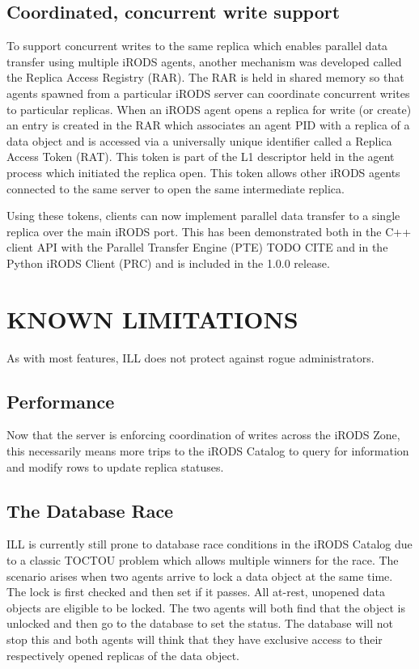 \documentclass{irodsugm}
\begin{document}
\subsection*{Coordinated, concurrent write support}
To support concurrent writes to the same replica which enables parallel data transfer using multiple iRODS agents, another mechanism was developed called the Replica Access Registry (RAR). The RAR is held in shared memory so that agents spawned from a particular iRODS server can coordinate concurrent writes to particular replicas. When an iRODS agent opens a replica for write (or create) an entry is created in the RAR which associates an agent PID with a replica of a data object and is accessed via a universally unique identifier called a Replica Access Token (RAT). This token is part of the L1 descriptor held in the agent process which initiated the replica open. This token allows other iRODS agents connected to the same server to open the same intermediate replica.

Using these tokens, clients can now implement parallel data transfer to a single replica over the main iRODS port. This has been demonstrated both in the C++ client API with the Parallel Transfer Engine (PTE) TODO CITE and in the Python iRODS Client (PRC)\cite{prc} and is included in the 1.0.0 release.

\section*{KNOWN LIMITATIONS}

As with most features, ILL does not protect against rogue administrators.

\subsection*{Performance}
Now that the server is enforcing coordination of writes across the iRODS Zone, this necessarily means more trips to the iRODS Catalog to query for information and modify rows to update replica statuses.

\subsection*{The Database Race}
ILL is currently still prone to database race conditions in the iRODS Catalog due to a classic TOCTOU\cite{toctou} problem which allows multiple winners for the race. The scenario arises when two agents arrive to lock a data object at the same time. The lock is first checked and then set if it passes. All at-rest, unopened data objects are eligible to be locked. The two agents will both find that the object is unlocked and then go to the database to set the status. The database will not stop this and both agents will think that they have exclusive access to their respectively opened replicas of the data object.
\end{document}
